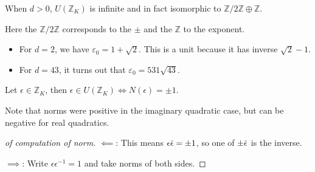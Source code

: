 \begin{corollary}

When \(d>0\), \(U({\mathbb{Z}}_K)\) is infinite and in fact isomorphic
to \({\mathbb{Z}}/2{\mathbb{Z}}\oplus {\mathbb{Z}}\).

\end{corollary}

\begin{remark}

Here the \({\mathbb{Z}}/2{\mathbb{Z}}\) corresponds to the \(\pm\) and
the \({\mathbb{Z}}\) to the exponent.

\end{remark}

\begin{example}

\envlist

\begin{itemize}
\item
  For \(d=2\), we have \(\varepsilon_0 = 1 + \sqrt{2}\). This is a unit
  because it has inverse \(\sqrt{2} -1\).
\item
  For \(d=43\), it turns out that \(\varepsilon_0 = 531 \sqrt{43}\).
\end{itemize}

\end{example}

\begin{lemma}

Let \(\epsilon\in {\mathbb{Z}}_K\), then
\(\epsilon \in U({\mathbb{Z}}_K) \iff N( \epsilon) = \pm 1\).

\end{lemma}

\begin{remark}

Note that norms were positive in the imaginary quadratic case, but can
be negative for real quadratics.

\end{remark}

\begin{proof}[of computation of norm]

\(\impliedby\): This means
\(\epsilon \mkern 1.5mu\overline{\mkern-1.5mu \epsilon \mkern-1.5mu}\mkern 1.5mu = \pm 1\),
so one of
\(\pm \mkern 1.5mu\overline{\mkern-1.5mu\epsilon\mkern-1.5mu}\mkern 1.5mu\)
is the inverse.

\(\implies\): Write \(\epsilon \epsilon ^{-1} = 1\) and take norms of
both sides.

\end{proof}

